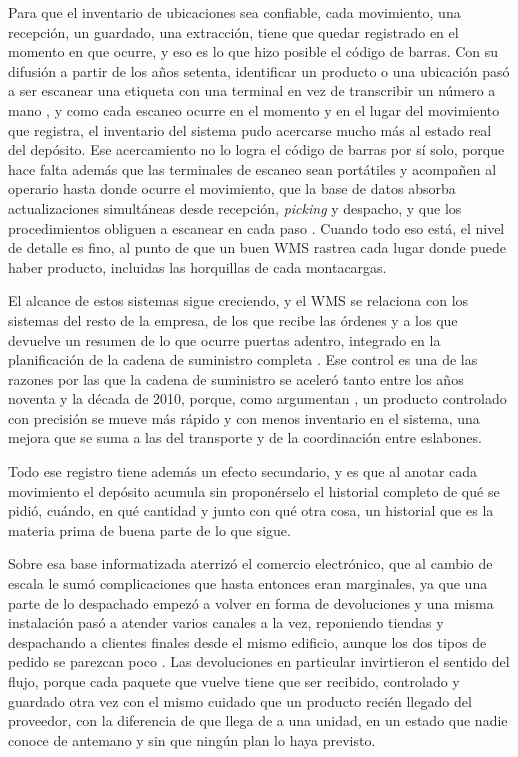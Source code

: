 Para que el inventario de ubicaciones sea confiable, cada movimiento, una recepción, un guardado, una extracción, tiene que quedar registrado en el momento en que ocurre, y eso es lo que hizo posible el código de barras.
Con su difusión a partir de los años setenta, identificar un producto o una ubicación pasó a ser escanear una etiqueta con una terminal en vez de transcribir un número a mano \citep{brown1997revolution}, y como cada escaneo ocurre en el momento y en el lugar del movimiento que registra, el inventario del sistema pudo acercarse mucho más al estado real del depósito.
Ese acercamiento no lo logra el código de barras por sí solo, porque hace falta además que las terminales de escaneo sean portátiles y acompañen al operario hasta donde ocurre el movimiento, que la base de datos absorba actualizaciones simultáneas desde recepción, \emph{picking} y despacho, y que los procedimientos obliguen a escanear en cada paso \citep[sección~4.2]{bartholdi2014warehouse}.
Cuando todo eso está, el nivel de detalle es fino, al punto de que un buen WMS rastrea cada lugar donde puede haber producto, incluidas las horquillas de cada montacargas.

El alcance de estos sistemas sigue creciendo, y el WMS se relaciona con los sistemas del resto de la empresa, de los que recibe las órdenes y a los que devuelve un resumen de lo que ocurre puertas adentro, integrado en la planificación de la cadena de suministro completa \citep[capítulo~4]{bartholdi2014warehouse}.
Ese control es una de las razones por las que la cadena de suministro se aceleró tanto entre los años noventa y la década de 2010, porque, como argumentan \citet[capítulo~4]{bartholdi2014warehouse}, un producto controlado con precisión se mueve más rápido y con menos inventario en el sistema, una mejora que se suma a las del transporte y de la coordinación entre eslabones.

Todo ese registro tiene además un efecto secundario, y es que al anotar cada movimiento el depósito acumula sin proponérselo el historial completo de qué se pidió, cuándo, en qué cantidad y junto con qué otra cosa, un historial que es la materia prima de buena parte de lo que sigue.

Sobre esa base informatizada aterrizó el comercio electrónico, que al cambio de escala le sumó complicaciones que hasta entonces eran marginales, ya que una parte de lo despachado empezó a volver en forma de devoluciones y una misma instalación pasó a atender varios canales a la vez, reponiendo tiendas y despachando a clientes finales desde el mismo edificio, aunque los dos tipos de pedido se parezcan poco \citep{boysen2019warehousing}.
Las devoluciones en particular invirtieron el sentido del flujo, porque cada paquete que vuelve tiene que ser recibido, controlado y guardado otra vez con el mismo cuidado que un producto recién llegado del proveedor, con la diferencia de que llega de a una unidad, en un estado que nadie conoce de antemano y sin que ningún plan lo haya previsto.


